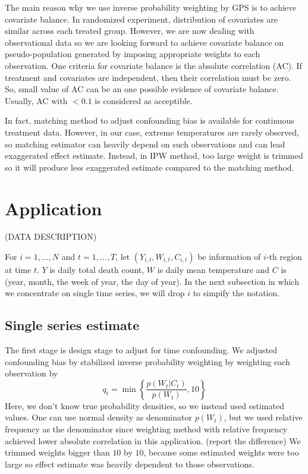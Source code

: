 \documentclass[12pt]{article}
\begin{document}
The main reason why we use inverse probability weighting by GPS is to achieve covariate balance.
In randomized experiment, distribution of covariates are similar across each treated group.
However, we are now dealing with observational data 
so we are looking forward to achieve covariate balance on pseudo-population generated by
imposing appropriate weights to each observation.
One criteria for covariate balance is the absolute correlation (AC)\cite{gpsboosting2015}.
If treatment and covariates are independent, then their correlation must be zero.
So, small value of AC can be an one possible evidence of covariate balance.
Usually, AC with $ <0.1 $ is considered as acceptible.

In fact, matching method to adjust confounding bias is available for continuous treatment data\cite{wu2020arxiv}.
However, in our case, extreme temperatures are rarely observed,
so matching estimator can heavily depend on such observations and can lead exaggerated effect estimate.
Instead, in IPW method, too large weight is trimmed so it will produce less exaggerated estimate
compared to the matching method.

\section{Application}

(DATA DESCRIPTION)

For $i = 1, \dots, N$ and $t = 1, \dots, T$, 
let $(Y_{i,t}, W_{i,t}, C_{i,t})$ be information of $i$-th region at time $t$.
$Y$ is daily total death count, $W$ is daily mean temperature 
and $C$ is (year, month, the week of year, the day of year).
In the next subsection in which we concentrate on single time series, 
we will drop $i$ to simpify the notation.

\subsection{Single series estimate}

The first stage is design stage to adjust for time confounding.
We adjusted confounding bias by stabilized inverse probability weighting\cite{sipw2010}
by weighting each observation by 
\[
	q_t = \min{ \left \{ \frac{p(W_t \lvert C_t)}{p(W_t)}, 10 \right \} }
\]
Here, we don't know true probability densities,
so we instead used estimated values.
One can use normal density as denominator $p(W_t)$,
but we used relative frequency as the denominator
since weighting method with relative frequency achieved 
lower absolute correlation in this application. (report the difference)
We trimmed weights bigger than $10$ by $10$,
because some estimated weights were too large so
effect estimate was heavily dependent to those observations.
\end{document}
